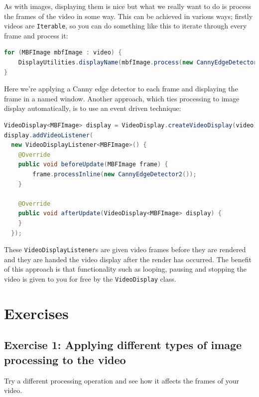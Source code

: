 As with images, displaying them is nice but what we really want to do is process the frames of 
the video in some way. This can be achieved in various ways; firstly videos are \verb+Iterable+, so you can 
do something like this to iterate through every frame and process it:
\begin{lstlisting}[language=java]
for (MBFImage mbfImage : video) {
    DisplayUtilities.displayName(mbfImage.process(new CannyEdgeDetector2()), "videoFrames");
}
\end{lstlisting}
Here we're applying a Canny edge detector to each frame and displaying the frame in a named window. Another 
approach, which ties processing to image display automatically, is to use an event driven technique:
\begin{lstlisting}[language=java]
VideoDisplay<MBFImage> display = VideoDisplay.createVideoDisplay(video);
display.addVideoListener(
  new VideoDisplayListener<MBFImage>() {
    @Override
    public void beforeUpdate(MBFImage frame) {
        frame.processInline(new CannyEdgeDetector2());
    }

    @Override
    public void afterUpdate(VideoDisplay<MBFImage> display) {
    }
  });
\end{lstlisting}

These \verb+VideoDisplayListener+s are given video frames before they are rendered and they are handed the 
video display after the render has occurred. The benefit of this approach is that functionality such as 
looping, pausing and stopping the video is given to you for free by the \verb+VideoDisplay+ class. 

\section*{Exercises}
\subsection*{Exercise 1: Applying different types of image processing to the video}
Try a different processing operation and see how it affects the frames of your video.
